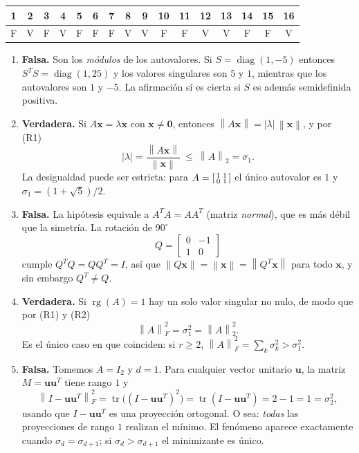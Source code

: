 \documentclass[11pt,a4paper]{article}
\newenvironment{solucion}{\solucionfmt}{\endsolucionfmt}
\newcommand{\bi}[1]{\boldsymbol{#1}}
\DeclareMathOperator{\rg}{rg}
\DeclareMathOperator{\tr}{tr}
\DeclareMathOperator{\diag}{diag}
\newcommand{\norm}[1]{\left\|#1\right\|}
\newcommand{\normF}[1]{\left\|#1\right\|_{F}}
\newcommand{\normdos}[1]{\left\|#1\right\|_{2}}
\begin{document}
\begin{solucion}
\begin{center}\small
\renewcommand{\arraystretch}{1.2}
\begin{tabular}{@{}*{16}{c}@{}}
\hline
1&2&3&4&5&6&7&8&9&10&11&12&13&14&15&16\\
\hline
F&V&F&V&F&F&F&V&V&F&F&V&V&F&F&V\\
\hline
\end{tabular}
\end{center}

\begin{enumerate}[label=\textbf{\arabic*.},itemsep=4pt,topsep=4pt,leftmargin=*]
\item \textbf{Falsa.} Son los \emph{módulos} de los autovalores. Si
$S=\diag(1,-5)$ entonces $S^TS=\diag(1,25)$ y los valores singulares son
$5$ y $1$, mientras que los autovalores son $1$ y $-5$. La afirmación sí es
cierta si $S$ es además semidefinida positiva.

\item \textbf{Verdadera.} Si $A\bi x=\lambda\bi x$ con $\bi x\neq\bi0$,
entonces $\norm{A\bi x}=|\lambda|\,\norm{\bi x}$, y por (R1)
\[
|\lambda|=\frac{\norm{A\bi x}}{\norm{\bi x}}\ \le\ \normdos{A}=\sigma_1 .
\]
La desigualdad puede ser estricta: para
$A=\begin{bsmallmatrix}1&1\\0&1\end{bsmallmatrix}$ el único autovalor es $1$
y $\sigma_1=(1+\sqrt5)/2$.

\item \textbf{Falsa.} La hipótesis equivale a $A^TA=AA^T$ (matriz
\emph{normal}), que es más débil que la simetría. La rotación de $90^\circ$
\[
Q=\begin{bmatrix}0&-1\\ 1&0\end{bmatrix}
\]
cumple $Q^TQ=QQ^T=I$, así que $\norm{Q\bi x}=\norm{\bi x}=\norm{Q^T\bi x}$
para todo $\bi x$, y sin embargo $Q^T\neq Q$.

\item \textbf{Verdadera.} Si $\rg(A)=1$ hay un solo valor singular no nulo,
de modo que por (R1) y (R2)
\[
\normF{A}^2=\sigma_1^2=\normdos{A}^2 .
\]
Es el único caso en que coinciden: si $r\ge2$, $\normF{A}^2=\sum_k\sigma_k^2>\sigma_1^2$.

\item \textbf{Falsa.} Tomemos $A=I_2$ y $d=1$. Para cualquier vector unitario
$\bi u$, la matriz $M=\bi u\bi u^T$ tiene rango $1$ y
\[
\normF{I-\bi u\bi u^T}^2=\tr\bigl((I-\bi u\bi u^T)^2\bigr)
=\tr(I-\bi u\bi u^T)=2-1=1=\sigma_2^2 ,
\]
usando que $I-\bi u\bi u^T$ es una proyección ortogonal. O sea: \emph{todas}
las proyecciones de rango $1$ realizan el mínimo. El fenómeno aparece
exactamente cuando $\sigma_d=\sigma_{d+1}$; si $\sigma_d>\sigma_{d+1}$ el
minimizante es único.


\end{enumerate}
\end{solucion}
\end{document}

